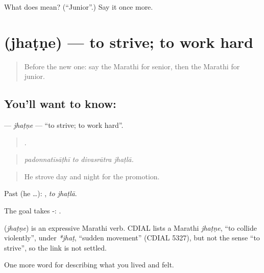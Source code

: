 \begin{tcolorbox}[breakable,colback=teal!4,colframe=teal!35!black,title={Before you move on}]
What does  mean? (\textquotedblleft{}Junior\textquotedblright{}.) Say it once more.
\end{tcolorbox}
\section[\texorpdfstring{\mr{झटणे} (jhaṭṇe)}{झटणे (jhaṭṇe)}]{ (jhaṭṇe) — to strive; to work hard}

\label{lesson:MR-C509-jhatne}



\begin{quote}
Before the new one: say the Marathi for senior, then the Marathi for junior.
\end{quote}

\subsection*{You'll want to know: }
\textbf{} — \emph{jhaṭṇe} — \textquotedblleft{}to strive; to work hard\textquotedblright{}.

\begin{quote}
   .
\end{quote}

\begin{quote}
\emph{padonnatīsāṭhī to divasrātra jhaṭlā.}
\end{quote}

\begin{quote}
He strove day and night for the promotion.
\end{quote}

Past (he …):  , \emph{to jhaṭlā}.

The goal takes -:  .

\begin{cousinweb}
\textbf{} (\emph{jhaṭṇe}) is an expressive Marathi verb. CDIAL lists a Marathi \emph{jhaṭṇe}, \textquotedblleft{}to collide violently\textquotedblright{}, under \emph{*jhaṭ}, \textquotedblleft{}sudden movement\textquotedblright{} (CDIAL 5327), but not the sense \textquotedblleft{}to strive\textquotedblright{}, so the link is not settled.
\end{cousinweb}

\begin{grammarlens}[title={What you've built}]
One more word for describing what you lived and felt.
\end{grammarlens}

